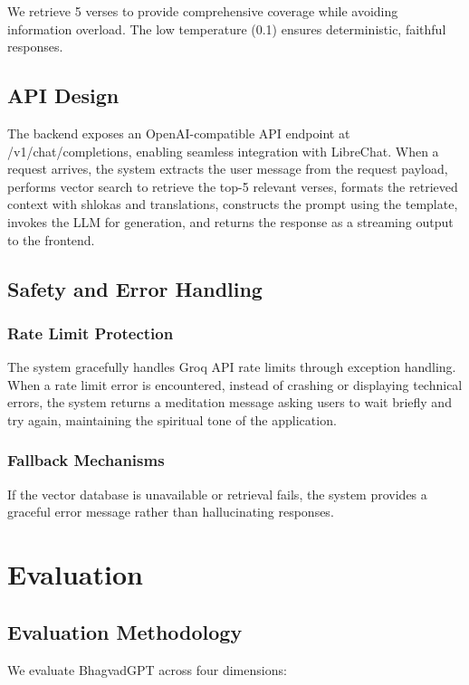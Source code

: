\documentclass[conference]{IEEEtran}
\begin{document}
We retrieve 5 verses to provide comprehensive coverage while avoiding information overload. The low temperature (0.1) ensures deterministic, faithful responses.

\subsection{API Design}

The backend exposes an OpenAI-compatible API endpoint at /v1/chat/completions, enabling seamless integration with LibreChat. When a request arrives, the system extracts the user message from the request payload, performs vector search to retrieve the top-5 relevant verses, formats the retrieved context with shlokas and translations, constructs the prompt using the template, invokes the LLM for generation, and returns the response as a streaming output to the frontend.

\subsection{Safety and Error Handling}

\subsubsection{Rate Limit Protection}
The system gracefully handles Groq API rate limits through exception handling. When a rate limit error is encountered, instead of crashing or displaying technical errors, the system returns a meditation message asking users to wait briefly and try again, maintaining the spiritual tone of the application.

\subsubsection{Fallback Mechanisms}
If the vector database is unavailable or retrieval fails, the system provides a graceful error message rather than hallucinating responses.

\section{Evaluation}

\subsection{Evaluation Methodology}

We evaluate BhagvadGPT across four dimensions:
\end{document}
